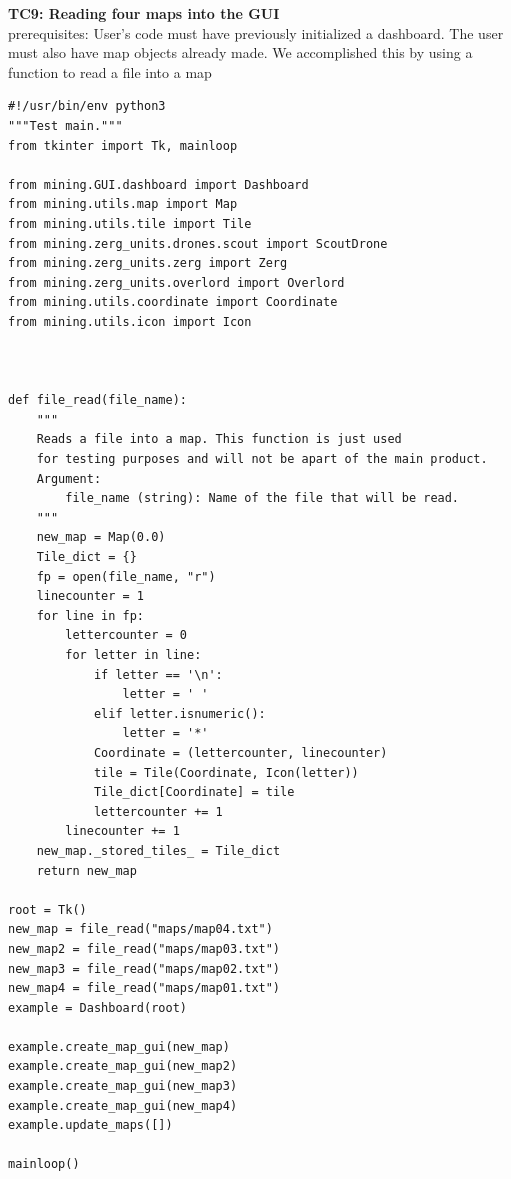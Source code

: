 \documentclass{article}
\begin{document}
\newpage
\Large\textbf{TC9: Reading four maps into the GUI}\\
\indent\large{prerequisites: User's code must have previously initialized a dashboard. The user must also have map objects already made. We accomplished this by using a function to 
read a file into a map}\\
\begin{lstlisting}
#!/usr/bin/env python3
"""Test main."""
from tkinter import Tk, mainloop

from mining.GUI.dashboard import Dashboard
from mining.utils.map import Map
from mining.utils.tile import Tile
from mining.zerg_units.drones.scout import ScoutDrone
from mining.zerg_units.zerg import Zerg
from mining.zerg_units.overlord import Overlord
from mining.utils.coordinate import Coordinate
from mining.utils.icon import Icon



def file_read(file_name):
    """
    Reads a file into a map. This function is just used
    for testing purposes and will not be apart of the main product.
    Argument:
        file_name (string): Name of the file that will be read.
    """
    new_map = Map(0.0)
    Tile_dict = {}
    fp = open(file_name, "r")
    linecounter = 1
    for line in fp:
        lettercounter = 0 
        for letter in line:
            if letter == '\n':
                letter = ' '
            elif letter.isnumeric():
                letter = '*'
            Coordinate = (lettercounter, linecounter)
            tile = Tile(Coordinate, Icon(letter))
            Tile_dict[Coordinate] = tile
            lettercounter += 1
        linecounter += 1
    new_map._stored_tiles_ = Tile_dict
    return new_map

root = Tk()
new_map = file_read("maps/map04.txt")
new_map2 = file_read("maps/map03.txt")
new_map3 = file_read("maps/map02.txt")
new_map4 = file_read("maps/map01.txt")
example = Dashboard(root)

example.create_map_gui(new_map)
example.create_map_gui(new_map2)
example.create_map_gui(new_map3)
example.create_map_gui(new_map4)
example.update_maps([])

mainloop()
\end{lstlisting}
\end{document}
